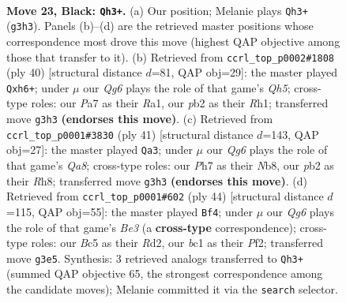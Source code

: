 \documentclass[11pt]{article}
\begin{document}
\clearpage

\begin{figure}[p]\centering
\begin{subfigure}{0.46\textwidth}\centering
\resizebox{\linewidth}{!}{%
\newchessgame
\chessboard[
  setfen={r5k1/pp2r2p/R3p1p1/2bB4/6PP/1N4q1/1P3P2/2BQ1R1K b - - 2 23},
  showmover=false,
  pgfstyle=straightmove, color=movearrow, markmove={g3-h3}
]}
\caption{}
\end{subfigure}\hfill
\begin{subfigure}{0.46\textwidth}\centering
\resizebox{\linewidth}{!}{%
\newchessgame
\chessboard[
  setfen={r1bq1k2/1p1nb3/4p2r/2Pn3Q/1PB5/7p/P4PPP/R3K2R w KQ - 0 21},
  showmover=false,
  pgfstyle=straightmove, color=movearrow, markmove={h5-h6}
]}
\caption{}
\end{subfigure}
\\[4pt]
\begin{subfigure}{0.46\textwidth}\centering
\resizebox{\linewidth}{!}{%
\newchessgame
\chessboard[
  setfen={rnb2k1r/pp3ppp/2pP4/3n4/P2NQ3/7P/3B2P1/qR2KB1R b K - 2 21},
  showmover=false,
  pgfstyle=straightmove, color=movearrow, markmove={a1-a3}
]}
\caption{}
\end{subfigure}\hfill
\begin{subfigure}{0.46\textwidth}\centering
\resizebox{\linewidth}{!}{%
\newchessgame
\chessboard[
  setfen={1r2r2k/p3P1pp/2Q2p2/q7/3p4/b3BP2/PP1R1P1P/1K5R w - - 0 23},
  showmover=false,
  pgfstyle=straightmove, color=movearrow, markmove={e3-f4}
]}
\caption{}
\end{subfigure}
\caption{\textbf{Move 23, Black: \texttt{Qh3+}.} (a) Our position; Melanie plays \texttt{Qh3+} (\texttt{g3h3}). Panels (b)--(d) are the retrieved master positions whose correspondence most drove this move (highest QAP objective among those that transfer to it). (b) Retrieved from \texttt{ccrl\_top\_p0002\#1808} (ply 40) [structural distance $d$=81, QAP obj=29]: the master played \texttt{Qxh6+}; under $\mu$ our \emph{Qg6} plays the role of that game's \emph{Qh5}; cross-type roles: our \emph{P}a7 as their \emph{R}a1, our \emph{p}b2 as their \emph{R}h1; transferred move \texttt{g3h3} \textbf{(endorses this move)}. (c) Retrieved from \texttt{ccrl\_top\_p0001\#3830} (ply 41) [structural distance $d$=143, QAP obj=27]: the master played \texttt{Qa3}; under $\mu$ our \emph{Qg6} plays the role of that game's \emph{Qa8}; cross-type roles: our \emph{P}h7 as their \emph{N}b8, our \emph{p}b2 as their \emph{R}h8; transferred move \texttt{g3h3} \textbf{(endorses this move)}. (d) Retrieved from \texttt{ccrl\_top\_p0001\#602} (ply 44) [structural distance $d$=115, QAP obj=55]: the master played \texttt{Bf4}; under $\mu$ our \emph{Qg6} plays the role of that game's \emph{Be3} (a \textbf{cross-type} correspondence); cross-type roles: our \emph{B}c5 as their \emph{R}d2, our \emph{b}c1 as their \emph{P}f2; transferred move \texttt{g3e5}. Synthesis: 3 retrieved analogs transferred to \texttt{Qh3+} (summed QAP objective 65, the strongest correspondence among the candidate moves); Melanie committed it via the \texttt{search} selector.}
\label{fig:thought-m45}
\end{figure}
\end{document}
